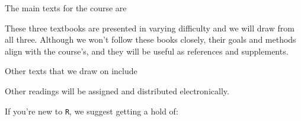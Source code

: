 \documentclass[12pt]{article}
\begin{document}
The main texts for the course are

\begin{verse}  \end{verse}

\begin{verse}  \end{verse}

\begin{verse}  \end{verse}

These three textbooks are presented in varying difficulty and we will draw from all three. Although we won't follow these books closely, their goals and methods align with the course's, and they will be useful as references and supplements.

Other texts that we draw on include

\begin{verse}   \end{verse}

\begin{verse}  \end{verse}












Other readings will be assigned and distributed electronically.

If you're new to \texttt{R}, we suggest getting a hold of:

\begin{verse}   \end{verse}
\end{document}
